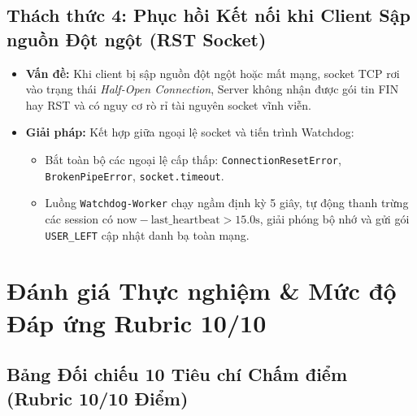 \documentclass[11pt,a4paper]{article}
\begin{document}
\subsection{Thách thức 4: Phục hồi Kết nối khi Client Sập nguồn Đột ngột (RST Socket)}
\begin{itemize}
    \item \textbf{Vấn đề:} Khi client bị sập nguồn đột ngột hoặc mất mạng, socket TCP rơi vào trạng thái \textit{Half-Open Connection}, Server không nhận được gói tin FIN hay RST và có nguy cơ rò rỉ tài nguyên socket vĩnh viễn.
    \item \textbf{Giải pháp:} Kết hợp giữa ngoại lệ socket và tiến trình Watchdog:
    \begin{itemize}
        \item Bắt toàn bộ các ngoại lệ cấp thấp: \texttt{ConnectionResetError}, \texttt{BrokenPipeError}, \texttt{socket.timeout}.
        \item Luồng \texttt{Watchdog-Worker} chạy ngầm định kỳ 5 giây, tự động thanh trừng các session có $\text{now} - \text{last\_heartbeat} > 15.0\text{s}$, giải phóng bộ nhớ và gửi gói \texttt{USER\_LEFT} cập nhật danh bạ toàn mạng.
    \end{itemize}
\end{itemize}

\newpage

\section{Đánh giá Thực nghiệm \& Mức độ Đáp ứng Rubric 10/10}

\subsection{Bảng Đối chiếu 10 Tiêu chí Chấm điểm (Rubric 10/10 Điểm)}
\end{document}
